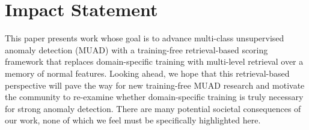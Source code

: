 \documentclass{article}
\theoremstyle{plain}
\theoremstyle{definition}
\theoremstyle{remark}
\begin{document}






\section*{Impact Statement}
This paper presents work whose goal is to advance multi-class unsupervised anomaly detection (MUAD) with a training-free retrieval-based scoring framework that replaces domain-specific training with multi-level retrieval over a memory of normal features. Looking ahead, we hope that this retrieval-based perspective will pave the way for new training-free MUAD research and motivate the community to re-examine whether domain-specific training is truly necessary for strong anomaly detection. There are many potential societal consequences of our work, none of which we feel must be specifically highlighted here.





\newpage
\appendix
\onecolumn
\end{document}
